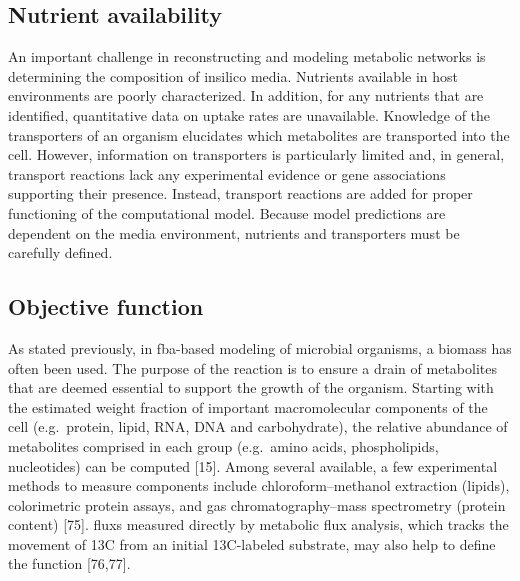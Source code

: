 \subsection{Nutrient availability}
An important challenge in reconstructing and modeling 
metabolic networks is determining the composition of 
\gls{insilico} media. Nutrients available in host environments 
are poorly characterized. In addition, for any nutrients 
that are identified, quantitative data on uptake rates 
are unavailable. Knowledge of the transporters of an 
organism elucidates which metabolites are transported 
into the cell. However, information on transporters 
is particularly limited and, in general, transport 
reactions lack any experimental evidence or gene 
associations supporting their presence. Instead, 
transport reactions are added for proper functioning 
of the computational model. Because model predictions are 
dependent on the media environment, nutrients and 
transporters must be carefully defined.

\subsection{Objective function}
As stated previously, in \gls{fba}-based modeling of microbial organisms, 
a \gls{biomass} has often been used. The purpose of 
the reaction is to ensure a drain of metabolites that 
are deemed essential to support the growth of the 
organism. Starting with the estimated weight fraction 
of important macromolecular components of the cell 
(e.g.\ protein, lipid, RNA, DNA and carbohydrate), the 
relative abundance of metabolites comprised in each 
group (e.g.\ amino acids, phospholipids, nucleotides) 
can be computed [15]. Among several available, a few 
experimental methods to measure  components 
include chloroform–methanol extraction (lipids), 
colorimetric protein assays, and gas chromatography–mass 
spectrometry (protein content) [75]. \Glspl{flux} measured 
directly by metabolic flux analysis, which tracks 
the movement of 13C from an initial 13C-labeled 
substrate, may also help to define the  
function [76,77].


